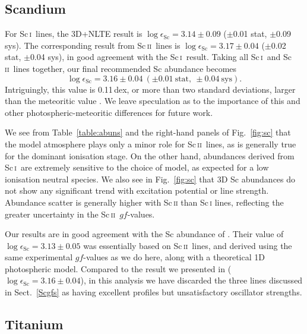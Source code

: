 \documentclass[traditabstract]{aa}
\newcommand{\altsci}{Sc\,\textsc{i}}
\newcommand{\altscii}{Sc\,\textsc{ii}}
\newcommand{\scani}{\altsci\ }
\newcommand{\scanii}{\altscii\ }
\begin{document}
\subsection{Scandium}
\label{Scresults}

For \scani lines, the 3D+NLTE result is $\log \epsilon_\mathrm{Sc}=3.14\pm0.09$ ($\pm$0.01 stat, $\pm$0.09 sys).  The corresponding result from \scanii lines is $\log \epsilon_\mathrm{Sc}=3.17\pm0.04$ ($\pm$0.02 stat, $\pm$0.04 sys), in good agreement with the \scani result.  Taking all \scani and \scanii lines together, our final recommended Sc abundance becomes
\begin{displaymath}
\log \epsilon_\mathrm{Sc}=3.16\pm0.04\ (\pm0.01\ \mathrm{stat},\ \pm0.04\ \mathrm{sys}).
\end{displaymath}
Intriguingly, this value is 0.11\,dex, or more than two standard deviations, larger than the meteoritic value \citep[$3.05\pm0.02$;][]{Lodders09}.  We leave speculation as to the importance of this and other photospheric-meteoritic differences for future work.

We see from Table~\ref{table:abuns} and the right-hand panels of Fig.~\ref{fig:sc} that the model atmosphere plays only a minor role for \scanii lines, as is generally true for the dominant ionisation stage.  On the other hand, abundances derived from \scani are extremely sensitive to the choice of model, as expected for a low ionisation neutral species.  We also see in Fig.~\ref{fig:sc} that 3D Sc abundances do not show any significant trend with excitation potential or line strength.  Abundance scatter is generally higher with Sc\,\textsc{ii} than Sc\,\textsc{i} lines, reflecting the greater uncertainty in the \scanii $gf$-values.

Our results are in good agreement with the  Sc abundance of \citet{Zhang08}. Their value of $\log \epsilon_\mathrm{Sc}=3.13\pm0.05$ was essentially based on \scanii lines, and derived using the same experimental $gf$-values as we do here, along with a theoretical 1D photospheric model.  Compared to the result we presented in  ($\log \epsilon_\mathrm{Sc}=3.16\pm0.04$), in this analysis we have discarded the three lines discussed in Sect.~\ref{Scgfs} as having excellent profiles but unsatisfactory oscillator strengths.

\subsection{Titanium}
\label{Tiresults}
\end{document}
